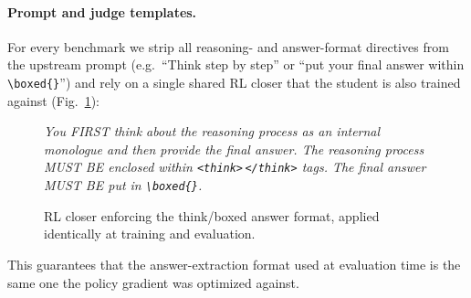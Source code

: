 \paragraph{Prompt and judge templates.}
For every benchmark we strip all reasoning- and answer-format directives from the upstream prompt (e.g.\ ``Think step by step'' or ``put your final answer within \verb|\boxed{}|'') and rely on a single shared RL closer that the student is also trained against (Fig.~\ref{fig:prompt-rl-closer}):
\begin{figure}[!htbp]
\begin{prompttemplatefig}
\small
\emph{You FIRST think about the reasoning process as an internal monologue and then provide the final answer. The reasoning process MUST BE enclosed within \texttt{<think>}\,\texttt{</think>} tags. The final answer MUST BE put in \texttt{\textbackslash boxed\{\}}.}
\end{prompttemplatefig}
\caption{RL closer enforcing the think/boxed answer format, applied identically at training and evaluation.}
\label{fig:prompt-rl-closer}
\end{figure}
This guarantees that the answer-extraction format used at evaluation time is the same one the policy gradient was optimized against.

